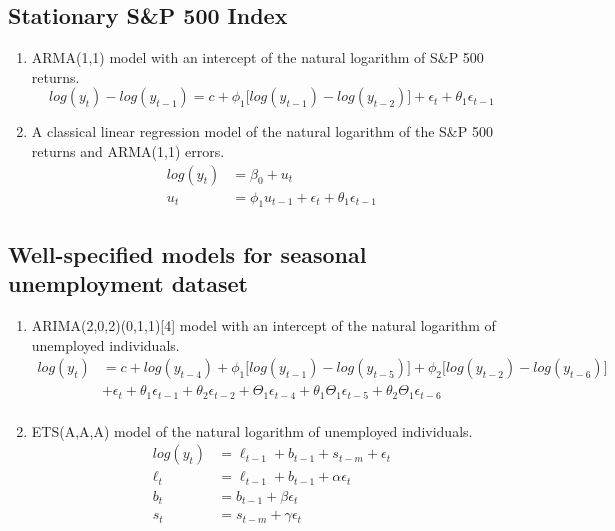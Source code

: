 \documentclass{monashthesis}
\begin{document}
\hypertarget{stationary-sp-500-index}{%
\subsection{Stationary S\&P 500 Index}\label{stationary-sp-500-index}}

\begin{enumerate}
\def\labelenumi{\arabic{enumi}.}
\item
  ARMA(1,1) model with an intercept of the natural logarithm of S\&P 500 returns.
  \begin{equation*}
  log(y_t) - log(y_{t-1}) = c + \phi_1\big[log(y_{t-1})-log(y_{t-2})\big] + \epsilon_t + \theta_1\epsilon_{t-1}
  \end{equation*}
\item
  A classical linear regression model of the natural logarithm of the S\&P 500 returns and ARMA(1,1) errors.
  \begin{align*}
  log(y_t) &= \beta_0 + u_t \\
  u_t &= \phi_1 u_{t-1} + \epsilon_t + \theta_1\epsilon_{t-1}
  \end{align*}
\end{enumerate}

\hypertarget{well-specified-models-for-seasonal-unemployment-dataset}{%
\subsection{Well-specified models for seasonal unemployment dataset}\label{well-specified-models-for-seasonal-unemployment-dataset}}

\begin{enumerate}
\def\labelenumi{\arabic{enumi}.}
\item
  ARIMA(2,0,2)(0,1,1){[}4{]} model with an intercept of the natural logarithm of unemployed individuals.
  \begin{align*}
  log(y_t) &= c + log(y_{t-4}) + \phi_1\big[log(y_{t-1})-log(y_{t-5})\big] + \phi_2\big[log(y_{t-2})-log(y_{t-6})\big] \\
        &+ \epsilon_t + \theta_1\epsilon_{t-1} + \theta_2\epsilon_{t-2} + \Theta_1\epsilon_{t-4} + \theta_1\Theta_1\epsilon_{t-5} + \theta_2\Theta_1\epsilon_{t-6} \\
  \end{align*}
\item
  ETS(A,A,A) model of the natural logarithm of unemployed individuals.
  \begin{align*}
  log(y_t) &= \ell_{t-1} + b_{t-1} + s_{t-m} + \epsilon_t \\
  \ell_t &= \ell_{t-1} + b_{t-1} + \alpha \epsilon_t \\
  b_t &= b_{t-1} + \beta \epsilon_t \\
  s_{t} &= s_{t-m} + \gamma \epsilon_t
  \end{align*}
\end{enumerate}
\end{document}
